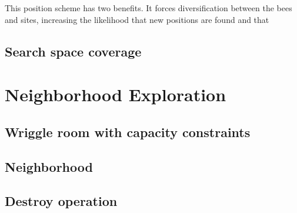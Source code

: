 This position scheme has two benefits. It forces diversification between the bees and sites, increasing the likelihood that new positions are found and that 




\subsection{Search space coverage}
\label{subsec:searchspacecoverage}



\section{Neighborhood Exploration}
\label{sec:neighborhoodexploration}

\subsection{Wriggle room with capacity constraints}

\subsection{Neighborhood}
\label{subsec:neighborhood}




\subsection{Destroy operation}

